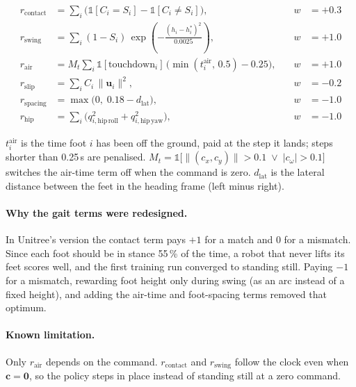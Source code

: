 \documentclass[11pt]{article}
\newcommand{\ind}{\mathbb{1}}
\begin{document}
\begin{equation}
\begin{aligned}
r_{\mathrm{contact}} &= \sum_i \Big(\ind[C_i = S_i] - \ind[C_i \neq S_i]\Big),
&\quad w &= +0.3 \\
r_{\mathrm{swing}} &= \sum_i (1 - S_i)\,
  \exp\!\left(-\frac{(h_i - h^{*}_i)^2}{0.0025}\right),
&\quad w &= +1.0 \\
r_{\mathrm{air}} &= M_t \sum_i \ind[\mathrm{touchdown}_i]\,
  \big(\min(t^{\mathrm{air}}_i,\, 0.5) - 0.25\big),
&\quad w &= +1.0 \\
r_{\mathrm{slip}} &= \sum_i C_i\, \lVert \mathbf{u}_i \rVert^2,
&\quad w &= -0.2 \\
r_{\mathrm{spacing}} &= \max\big(0,\; 0.18 - d_{\mathrm{lat}}\big),
&\quad w &= -1.0 \\
r_{\mathrm{hip}} &= \sum_i \big(q_{i,\mathrm{hip\,roll}}^2 + q_{i,\mathrm{hip\,yaw}}^2\big),
&\quad w &= -1.0
\end{aligned}
\end{equation}

\noindent
$t^{\mathrm{air}}_i$ is the time foot $i$ has been off the ground, paid at the
step it lands; steps shorter than 0.25\,s are penalised.
$M_t = \ind\big[\lVert (c_x, c_y) \rVert > 0.1 \;\lor\; |c_\omega| > 0.1\big]$
switches the air-time term off when the command is zero.
$d_{\mathrm{lat}}$ is the lateral distance between the feet in the heading frame
(left minus right).

\paragraph{Why the gait terms were redesigned.}
In Unitree's version the contact term pays $+1$ for a match and $0$ for a
mismatch. Since each foot should be in stance 55\,\% of the time, a robot that
never lifts its feet scores well, and the first training run converged to
standing still. Paying $-1$ for a mismatch, rewarding foot height only during
swing (as an arc instead of a fixed height), and adding the air-time and
foot-spacing terms removed that optimum.

\paragraph{Known limitation.}
Only $r_{\mathrm{air}}$ depends on the command. $r_{\mathrm{contact}}$ and
$r_{\mathrm{swing}}$ follow the clock even when $\mathbf{c} = \mathbf{0}$, so
the policy steps in place instead of standing still at a zero command.
\end{document}
